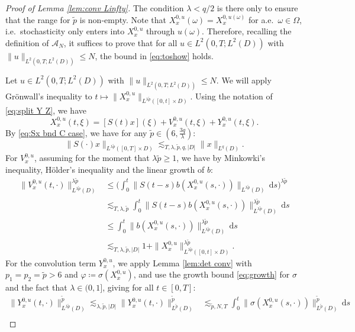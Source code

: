 \documentclass{amsart}
\theoremstyle{plain}
\theoremstyle{remark}
\theoremstyle{plain}
\numberwithin{equation}{section}
\newcommand{\ceqq}{\coloneqq}
\newcommand{\Om}{\Omega}
\newcommand{\om}{\omega}
\newcommand{\A}{{\mathcal A}}
\newcommand{\dd}{\,\mathrm{d}}
\begin{document}
\begin{proof}[Proof of Lemma \ref{lem:conv Linfty}]
The condition $\lambda <{q}/{2}$ is there only to  ensure that the range for $\tilde p$ is non-empty. 
Note that $X_x^{0,u}(\om)=X_x^{0,u(\om)}$ for a.e.\ $\om\in\Om$, i.e.\ stochasticity only enters into $X_x^{0,u}$ through $u(\om)$. Therefore, recalling the definition of $\A_N$, it suffices to prove that for all $u\in L^2(0,T;L^2(D))$ with $\|u\|_{L^2(0,T;L^2(D))}\leq N$, the bound in \eqref{eq:toshow} holds.  

Let $u\in L^2(0,T;L^2(D))$  with $\|u\|_{L^2(0,T;L^2(D))}\leq N$. We will apply Gr\"onwall's inequality to $t\mapsto  \|X_x^{0,u}\|_{L^{\lambda \tilde p}([0,t]\times D)}$.   
Using the notation of \eqref{eq:split Y Z}, we have
\[
  X_x^{0,u}(t,\xi)= 
  [S(t)x](\xi)+V_x^{0,u}(t,\xi)+Y_x^{0,u}(t,\xi). 
\]
By \eqref{eq:Sx bnd C case}, we have for any $\tilde p\in (6,\frac{3q}{\lambda})$:  
\begin{equation}\label{eq:Sx est}
\|S(\cdot)x\|_{L^{\lambda \tilde p}([0,T]\times D)}\lesssim_{T,\lambda,\tilde p,q,|D|} \|x\|_{L^q(D)}.
\end{equation} 
For $V_x^{0,u}$,  assuming for the moment that $\lambda\tilde p\geq 1$, we have 
by Minkowki's inequality, H\"older's inequality and the linear growth of $b$:
\begin{align*}
\|V_x^{0,u}(t,\cdot)\|_{L^{\lambda\tilde p}(D)}^{\lambda\tilde p}
&\leq \Big(\int_0^t\|S(t-s)b(X_x^{0,u}(s,\cdot))\|_{L^{\lambda\tilde p}(D)}\dd s\Big)^{\lambda\tilde p}\\
&\lesssim_{T,\lambda,\tilde p} \int_0^t\|S(t-s)b(X_x^{0,u}(s,\cdot))\|_{L^{\lambda\tilde p}(D)}^{\lambda\tilde p}\dd s \\
&\leq \int_0^t\|b(X_x^{0,u}(s,\cdot))\|_{L^{\lambda\tilde p}(D)}^{\lambda\tilde p}\dd s\\
&\lesssim_{T,\lambda,\tilde p,|D|} 1+ \|X_x^{0,u}\|_{L^{\lambda\tilde p}([0,t]\times D)}^{\lambda\tilde p}.
\end{align*}
For the convolution term $Y_x^{0,u}$, we apply Lemma \ref{lem:det conv}   with $p_1=p_2= \tilde p>6$ and $\varphi\ceqq \sigma(X_x^{0,u})$, and use the growth bound \eqref{eq:growth} for $\sigma$ and the fact that $\lambda \in (0,1]$, giving  for all $t\in[0,T]$:  
\begin{align*}
  \|Y_x^{0,u}(t,\cdot)\|_{L^{\lambda\tilde p}(D)}^{\tilde p}
  \lesssim_{\lambda,\tilde p,|D|}\|Y_x^{0,u}(t,\cdot)\|_{L^{\tilde p}(D)}^{\tilde p} 
  &\lesssim_{\tilde p,N,T} \int_0^t \|\sigma(X_x^{0,u}(s,\cdot))\|_{L^{\tilde p}(D)}^{\tilde p}\dd s \\

\end{align*}
\end{proof}
\end{document}
